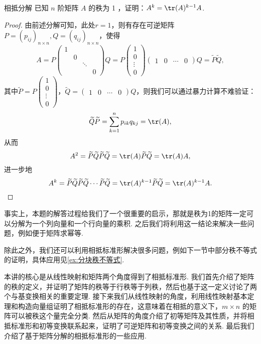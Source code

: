 \begin{example}{}{相抵分解}
    已知 $n$ 阶矩阵 $A$ 的秩为 1 ，证明：$A^k=\tr(A)^{k-1}A$.
\end{example}

\begin{proof}
    由前述分解可知，此处$r=1$，则有存在可逆矩阵 $P=(p_{ij})_{n \times n},Q=(q_{ij})_{n \times n}$，使得
    \[A=P\begin{pmatrix}
            1 &   &        &   \\
              & 0 &        &   \\
              &   & \ddots &   \\
              &   &        & 0
        \end{pmatrix} Q=P\begin{pmatrix}
            1 \\ 0 \\ \vdots \\ 0
        \end{pmatrix}\begin{pmatrix}
            1 & 0 & \cdots & 0
        \end{pmatrix} Q=\widetilde{P} \widetilde{Q},\]
    其中$\widetilde{P}=P\begin{pmatrix}
            1 \\ 0 \\ \vdots \\ 0
        \end{pmatrix}$，$\widetilde{Q}=\begin{pmatrix}
            1 & 0 & \cdots & 0
        \end{pmatrix} Q$，则我们可以通过暴力计算不难验证：
    \[\widetilde{Q} \widetilde{P}=\sum_{k=1}^{n} p_{i k} q_{k j}=\tr(A),\]
    从而
    \[A^{2}=\widetilde{P} \widetilde{Q} \widetilde{P} \widetilde{Q}=\tr(A) \widetilde{P} \widetilde{Q}=\tr(A) A,\]
    进一步地
    \[A^{k}=\widetilde{P} \widetilde{Q} \widetilde{P} \widetilde{Q} \cdots \widetilde{P} \widetilde{Q}=\tr(A)^{k-1} \widetilde{P} \widetilde{Q}=\tr(A)^{k-1} A.\]
\end{proof}

事实上，本题的解答过程给我们了一个很重要的启示，那就是秩为1的矩阵一定可以分解为一个列向量和一个行向量的乘积. 之后我们将利用这一结论来解决一些问题，例如便于矩阵求幂等.

除此之外，我们还可以利用相抵标准形解决很多问题，例如下一节中部分秩不等式的证明，具体应用见\autoref{ex:分块秩不等式}.

\begin{summary}

    本讲的核心是从线性映射和矩阵两个角度得到了相抵标准形. 我们首先介绍了矩阵的秩的定义，并证明了矩阵的秩等于行秩等于列秩，然后也基于这一定义讨论了两个与基变换相关的重要定理. 接下来我们从线性映射的角度，利用线性映射基本定理和构造向量组证明了相抵标准形的存在，这意味着在相抵的意义下，$m\times n$ 的矩阵可以被秩这个量完全分类. 然后从矩阵的角度介绍了初等矩阵及其性质，并将相抵标准形和初等变换联系起来，证明了可逆矩阵和初等变换之间的关系. 最后我们介绍了基于矩阵分解的相抵标准形的一些应用.

\end{summary}

